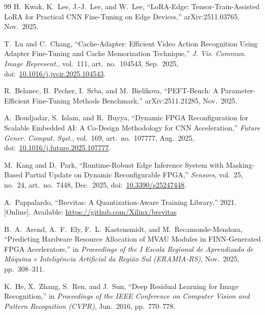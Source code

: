 \documentclass[journal]{IEEEtran}
\begin{document}
\begin{thebibliography}{99}
H.~Kwak, K.~Lee, J.-J.~Lee, and W.~Lee,
``LoRA-Edge: Tensor-Train-Assisted LoRA for Practical CNN Fine-Tuning on Edge Devices,''
arXiv:2511.03765, Nov.~2025.

T.~Lu and C.~Chang,
``Cache-Adapter: Efficient Video Action Recognition Using Adapter Fine-Tuning and Cache Memorization Technique,''
\emph{J. Vis. Commun. Image Represent.}, vol.~111, art.~no.~104543, Sep.~2025,
doi:~\url{10.1016/j.jvcir.2025.104543}.

R.~Belanec, B.~Pecher, I.~Srba, and M.~Bielikova,
``PEFT-Bench: A Parameter-Efficient Fine-Tuning Methods Benchmark,''
arXiv:2511.21285, Nov.~2025.

A.~Boudjadar, S.~Islam, and R.~Buyya,
``Dynamic FPGA Reconfiguration for Scalable Embedded AI: A Co-Design Methodology for CNN Acceleration,''
\emph{Future Gener. Comput. Syst.}, vol.~169, art.~no.~107777, Aug.~2025,
doi:~\url{10.1016/j.future.2025.107777}.

M.~Kang and D.~Park,
``Runtime-Robust Edge Inference System with Masking-Based Partial Update on Dynamic Reconfigurable FPGA,''
\emph{Sensors}, vol.~25, no.~24, art.~no.~7448, Dec.~2025,
doi:~\url{10.3390/s25247448}.

A.~Pappalardo,
``Brevitas: A Quantization-Aware Training Library,''
2021. [Online]. Available: \url{https://github.com/Xilinx/brevitas}


B.~A.~Arend, A.~F.~Ely, F.~L.~Kastensmidt, and M.~Recamonde-Mendoza,
``Predicting Hardware Resource Allocation of MVAU Modules in FINN-Generated FPGA Accelerators,''
in \emph{Proceedings of the I Escola Regional de Aprendizado de M\'aquina e Intelig\^encia Artificial da Regi\~ao Sul (ERAMIA-RS)}, Nov.~2025, pp.~308--311.

K.~He, X.~Zhang, S.~Ren, and J.~Sun,
``Deep Residual Learning for Image Recognition,''
in \emph{Proceedings of the IEEE Conference on Computer Vision and Pattern Recognition (CVPR)}, Jun.~2016, pp.~770--778.

\end{thebibliography}
\end{document}
